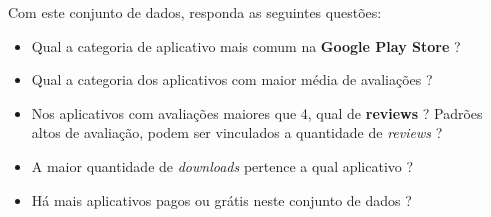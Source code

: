 \documentclass[12pt]{article}
\begin{document}
Com este conjunto de dados, responda as seguintes questões:

\begin{itemize}
    \item Qual a categoria de aplicativo mais comum na \textbf{Google Play Store} ?
    \item Qual a categoria dos aplicativos com maior média de avaliações ?
    \item Nos aplicativos com avaliações maiores que 4, qual de \textbf{reviews} ? Padrões altos de avaliação, podem ser vinculados a quantidade de \textit{reviews} ?
    \item A maior quantidade de \textit{downloads} pertence a qual aplicativo ?
    \item Há mais aplicativos pagos ou grátis neste conjunto de dados ?
\end{itemize}



% 
% 
\end{document}
